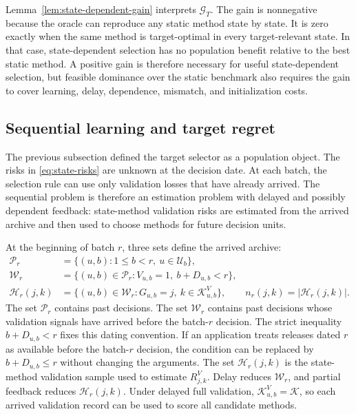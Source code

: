\documentclass[a4paper, 12pt]{article}
\theoremstyle{plain}
\theoremstyle{remark}
\newcommand{\Kcal}{\mathcal{K}}
\newcommand{\Ucal}{\mathcal{U}}
\newcommand{\1}{\mathbf{1}}
\begin{document}
Lemma~\ref{lem:state-dependent-gain} interprets \(\mathcal G_T\). The gain is nonnegative because the oracle can reproduce any static method state by state. It is zero exactly when the same method is target-optimal in every target-relevant state. In that case, state-dependent selection has no population benefit relative to the best static method. A positive gain is therefore necessary for useful state-dependent selection, but feasible dominance over the static benchmark also requires the gain to cover learning, delay, dependence, mismatch, and initialization costs.

\subsection{Sequential learning and target regret}

The previous subsection defined the target selector as a population object. The risks in \eqref{eq:state-risks} are unknown at the decision date. At each batch, the selection rule can use only validation losses that have already arrived. The sequential problem is therefore an estimation problem with delayed and possibly dependent feedback: state-method validation risks are estimated from the arrived archive and then used to choose methods for future decision units.

At the beginning of batch \(r\), three sets define the arrived archive:
\begin{equation}
\label{eq:arrived-archive}
\begin{aligned}
    \mathcal P_r&=\{(u,b):1\leq b<r,\ u\in\Ucal_b\},
    \\
    \mathcal W_r&=\{(u,b)\in\mathcal P_r:V_{u,b}=1,\ b+D_{u,b}<r\},
    \\
    \mathcal H_r(j,k)&=
    \{(u,b)\in\mathcal W_r:G_{u,b}=j,\ k\in\Kcal^V_{u,b}\},
    \qquad
    n_r(j,k)=|\mathcal H_r(j,k)| .
\end{aligned}
\end{equation}
The set \(\mathcal P_r\) contains past decisions. The set \(\mathcal W_r\) contains past decisions whose validation signals have arrived before the batch-\(r\) decision. The strict inequality \(b+D_{u,b}<r\) fixes this dating convention. If an application treats releases dated \(r\) as available before the batch-\(r\) decision, the condition can be replaced by \(b+D_{u,b}\leq r\) without changing the arguments. The set \(\mathcal H_r(j,k)\) is the state-method validation sample used to estimate \(R^V_{j,k}\). Delay reduces \(\mathcal W_r\), and partial feedback reduces \(\mathcal H_r(j,k)\). Under delayed full validation, \(\Kcal^V_{u,b}=\Kcal\), so each arrived validation record can be used to score all candidate methods.
\end{document}
